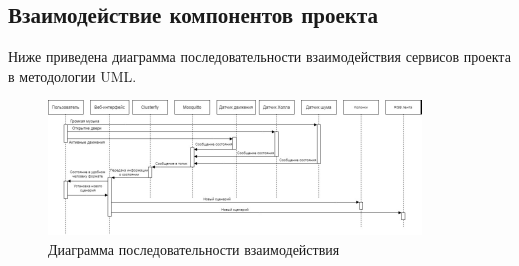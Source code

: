 \documentclass[a4paper,14pt]{extarticle}
\begin{document}
\subsection{Взаимодействие компонентов проекта}
Ниже приведена диаграмма последовательности взаимодействия сервисов проекта в методологии UML.
\begin{figure}[htpb]
	\centering
	\includegraphics[width=0.9\linewidth]{images/sql}
	\caption{Диаграмма последовательности взаимодействия}
	\label{fig:sql}
\end{figure}








\newpage
\end{document}
